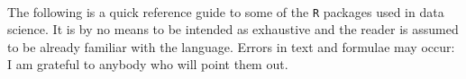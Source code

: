 
\begin{titlepage}
\begin{center}
\large  
\hfill
\vfill

\begingroup
    \color{Maroon}\spacedallcaps{\myTitle} \\ \bigskip
\endgroup

\myName 

\vspace{1cm}
The following is a quick reference guide to 
some of the \texttt{R} packages used in data science. It
is by no means to be intended as exhaustive and the
reader is assumed to be already familiar with
the language. Errors in text and formulae may occur:
I am grateful to anybody who will point them out.
\vfill               
\end{center}        
\end{titlepage} 